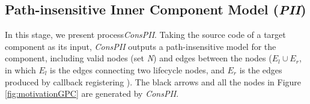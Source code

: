 
\subsection{Path-insensitive Inner Component Model (\textit{PII})}
In this stage, we present process\textit{ConsPII}. Taking the source code of a target component as its input, \textit{ConsPII} 
outputs a path-insensitive model for the component, including valid nodes (set \textit{N}) and edges between the nodes ($E_{l} \cup E_{r}$, in which $E_l$ is the edges connecting two lifecycle nodes, and $E_r$ is the edges produced by callback registering
). The black arrows and all the nodes in Figure \ref{fig:motivationGPC} are generated by \textit{ConsPII}. 



